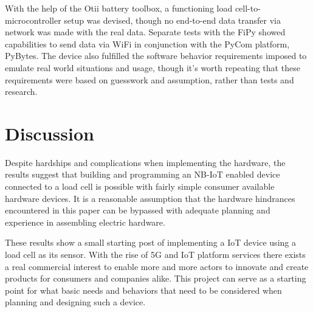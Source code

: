 \iffalse
\begin{itemize}
	\item Don’t make the reader do all the work
	\item Have a hypothesis, test them, state result clearly
	\item Two lists are not a comparison
	\item Be the first to criticize your own work
\end{itemize}
\fi

With the help of the Otii battery toolbox, a functioning load cell-to-microcontroller setup was devised, though no end-to-end data transfer via network was made with the real data. Separate tests with the FiPy showed capabilities to send data via WiFi in conjunction with the PyCom platform, PyBytes. %
The device also fulfilled the software behavior requirements imposed to emulate real world situations and usage, though it's worth repeating that these requirements were based on guesswork and assumption, rather than tests and research.

\section{Discussion}
Despite hardships and complications when implementing the hardware, the results suggest that building and programming an NB-IoT enabled device connected to a load cell is possible with fairly simple consumer available hardware devices. It is a reasonable assumption that the hardware hindrances encountered in this paper can be bypassed with adequate planning and experience in assembling electric hardware.

These results show a small starting post of implementing a IoT device using a load cell as its sensor. With the rise of 5G and IoT platform services there exists a real commercial interest to enable more and more actors to innovate and create products for consumers and companies alike. This project can serve as a starting point for what basic needs and behaviors that need to be considered when planning and designing such a device.	

